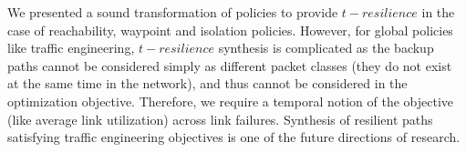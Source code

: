 We presented a sound transformation of policies to provide $t-resilience$ in
the case of reachability, waypoint and isolation policies. However, for global policies like 
traffic engineering, $t-resilience$ synthesis is complicated as the backup paths 
cannot be considered simply as different packet classes (they do not exist at the same time
in the network),
and thus cannot be considered in the optimization objective. Therefore, we require a 
temporal notion of the objective (like average link utilization) across link failures.
 Synthesis of resilient paths
satisfying traffic engineering objectives is one of the future directions of research.